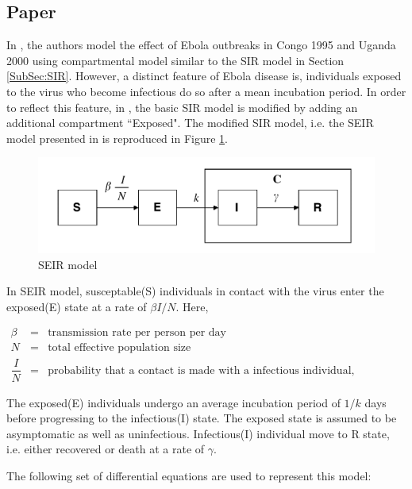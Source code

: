 \documentclass[12pt, journal,onecolumn]{IEEEtran}
\begin{document}
\subsection{\textbf{Paper \citep{chowell2004basic}}}

In \citep{chowell2004basic}, the authors model the effect of Ebola outbreaks in Congo 1995 and Uganda
2000 using compartmental model similar to the SIR model in Section \ref{SubSec:SIR}. However, a
distinct feature of Ebola disease is, individuals exposed to the virus who become infectious do so
after a mean incubation period. In order to reflect this feature, in \citep{chowell2004basic}, the
basic SIR model is modified by adding an additional compartment ``Exposed". The modified SIR model,
i.e. the SEIR model presented in \citep{chowell2004basic} is reproduced in
Figure \ref{fig:SEIR_model}.

\begin{figure}[h!]
\captionsetup{justification=centering}
\includegraphics[scale=0.5]{seir_model_fig}
\centering\caption{SEIR model}
\label{fig:SEIR_model}
\end{figure}

In SEIR model, susceptable(S) individuals in contact with the virus enter the exposed(E) state at a rate of $\beta I / N$. Here,

\begin{eqnarray*}
\beta &=& \text{transmission rate per person per day}\\
N &=& \text{total effective population size}\\
\dfrac{I}{N} &=& \text{probability that a contact is made with a infectious individual, assuming random uniform mixing}
\end{eqnarray*}

The exposed(E) individuals undergo an average incubation period of $1/k$ days before progressing to the infectious(I) state. The exposed state is assumed to be asymptomatic as well as uninfectious. Infectious(I) individual move to R state, i.e. either recovered or death at a rate of $\gamma$.

The following set of differential equations are used to represent this model:
\end{document}
